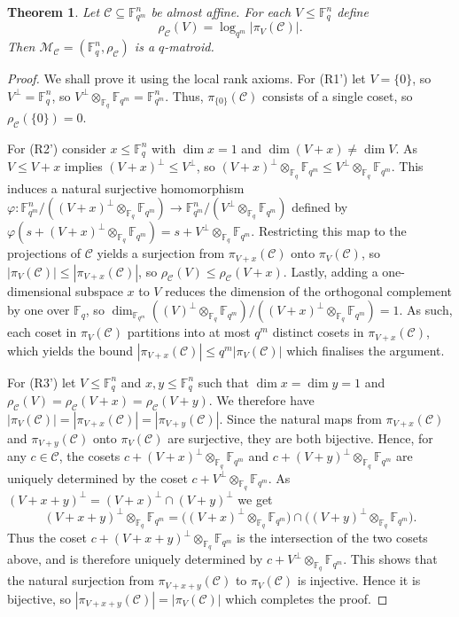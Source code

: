 \documentclass[a4paper,11pt,reqno]{article}
\newcommand{\F}{\mathbb{F}}
\newcommand{\C}{\mathcal{C}}
\theoremstyle{plain} \numberwithin{equation}{section}
\newtheorem{theorem}{Theorem}[section]
\theoremstyle{definition}
\renewcommand{\phi}{\varphi}
\begin{document}
\begin{theorem}
Let $\C\subseteq \F_{q^m}^n$ be almost affine. For each $V\leq \F_q^n$ define $$\rho_\C(V) = \log_{q^m} |\pi_V(\mathcal{C})|.$$ Then $\mathcal{M}_\C = (\F_q^n,\rho_\C)$ is a $q$-matroid.
\end{theorem}
\begin{proof} We shall prove it using the local rank axioms. For (R1') let $V=\{0\}$, so $V^\perp = \F_q^n$, so $V^\perp \otimes_{\F_q}\F_{q^m} = \F_{q^m}^n$. Thus, $\pi_{\{0\}}(\C)$ consists of a single coset, so $\rho_\C(\{0\})=0$.

For (R2') consider $x\leq \F_q^n$ with $\dim x =1$ and $\dim (V+x) \neq \dim V$. As $V\leq V+x$ implies $(V+x)^\perp \leq V^\perp$, so $(V+x)^\perp \otimes_{\F_q}\F_{q^m} \leq V^\perp \otimes_{\F_q}\F_{q^m}$. This induces a natural surjective homomorphism $\phi \colon \F_{q^m}^n/((V+x)^\perp \otimes_{\F_q}\F_{q^m}) \rightarrow \F_{q^m}^n/(V^\perp \otimes_{\F_q}\F_{q^m})$ defined by $\phi(s+(V+x)^\perp \otimes_{\F_q}\F_{q^m}) = s + V^\perp \otimes_{\F_q}\F_{q^m}$. Restricting this map to the projections of $\C$ yields a surjection from $\pi_{V+x}(\C)$ onto $\pi_V(\C)$, so $|\pi_V(\C)|\leq |\pi_{V+x}(\C)|$, so $\rho_\C(V) \leq \rho_\C(V+x)$. Lastly, adding a one-dimensional subspace $x$ to $V$ reduces the dimension of the orthogonal complement by one over $\F_q$, so $\dim_{\F_{q^m}} \left((V)^\perp \otimes_{\F_q}\F_{q^m}\right) / \left( (V+x)^\perp \otimes_{\F_q}\F_{q^m}\right) = 1$. As such, each coset in $\pi_V( \C)$ partitions into at most $q^m$ distinct cosets in $\pi_{V+x}(\C)$, which yields the bound $|\pi_{V+x}(\C)|\leq q^m |\pi_V(\C)|$ which finalises the argument.

For (R3’) let $V \le \F^n_q$ and $x,y \le \F^n_q$ such that $\dim x = \dim y = 1$ and $\rho_\C (V)=\rho_\C(V+x)=\rho_\C(V+y).$ We therefore have $|\pi_V(\C)|=|\pi_{V+x}(\C)|=|\pi_{V+y}(\C)|$.
Since the natural maps from $\pi_{V+x}(\C)$ and $\pi_{V+y}(\C)$ onto $\pi_V(\C)$ are surjective, they are both bijective. Hence, for any $c \in \C$, the cosets $c+(V+x)^\perp \otimes_{\F_q}\F_{q^m}$ and $c+(V+y)^\perp \otimes_{\F_q}\F_{q^m}$ are uniquely determined by the coset $c+V^\perp \otimes_{\F_q}\F_{q^m}$. As $(V+x+y)^\perp=(V+x)^\perp \cap (V+y)^\perp$ we get
\[
(V+x+y)^\perp \otimes_{\F_q}\F_{q^m} = \big((V+x)^\perp \otimes_{\F_q}\F_{q^m}\big)\cap \big((V+y)^\perp \otimes_{\F_q}\F_{q^m}\big).
\]
Thus the coset $c+(V+x+y)^\perp \otimes_{\F_q}\F_{q^m}$ is the intersection of the two cosets above, and is therefore uniquely determined by $c+V^\perp \otimes_{\F_q}\F_{q^m}$. This shows that the natural surjection from $\pi_{V+x+y}(\C)$ to $\pi_V(\C)$ is injective. Hence it is bijective, so $|\pi_{V+x+y}(\C)|=|\pi_V(\C)|$ which completes the proof.
\end{proof}
\end{document}
